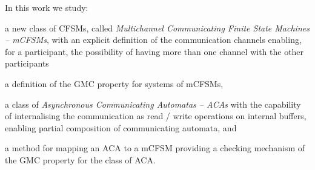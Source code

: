 In this work we study:
\begin{inparaenum}[1)]
 \item a new class of CFSMs, called \emph{Multichannel Communicating Finite State Machines -- mCFSMs}, with an explicit definition of the communication channels enabling, for a participant, the possibility of having more than one channel with the other participants
 \item a definition of the GMC property for systems of mCFSMs, 
 \item a class of \emph{Asynchronous Communicating Automatas -- ACAs} with the capability of internalising the communication as read / write operations on internal buffers, enabling partial composition of communicating automata, and
 \item a method for mapping an ACA to a mCFSM providing a checking mechanism of the GMC property for the class of ACA.
 \end{inparaenum}

% 
% 